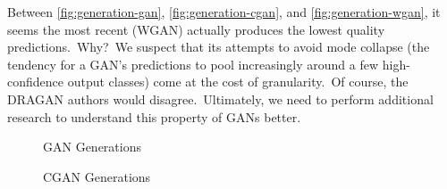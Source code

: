 \documentclass[conference]{IEEEtran}
\begin{document}
    Between \autoref{fig:generation-gan}, \autoref{fig:generation-cgan}, and \autoref{fig:generation-wgan}, it seems the most recent (WGAN) actually produces the lowest quality predictions.\ Why?\ We suspect that its attempts to avoid mode collapse (the tendency for a GAN's predictions to pool increasingly around a few high-confidence output classes) come at the cost of granularity.\ Of course, the DRAGAN authors would disagree.\ Ultimately, we need to perform additional research to understand this property of GANs better.

    \begin{figure}
        \caption{GAN Generations}
        \label{fig:generation-gan}
        \centering
    \end{figure}

    \begin{figure}
        \caption{CGAN Generations}
        \label{fig:generation-cgan}
        \centering
    \end{figure}
\end{document}
